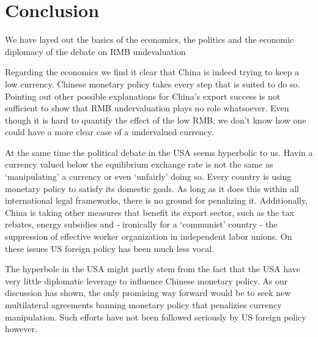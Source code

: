
\section{Conclusion}

We have layed out the basics of the economics, the politics and the economic diplomacy of the debate on RMB undevaluation

Regarding the economics we find it clear that China is indeed trying to keep a low currency. Chinese monetary policy takes every step that is suited to do so. Pointing out other possible explanations for China's export success is not sufficient to show that RMB undervaluation plays no role whatsoever. Even though it is hard to quantify the effect of the low RMB, we don't know how one could have a more clear case of a undervalued currency.

At the same time the political debate in the USA seems hyperbolic to us. Havin a currency valued below the equilibrium exchange rate is not the same as `manipulating' a currency or even `unfairly' doing so. Every country is using monetary policy to satisfy its domestic goals. As long as it does this within all international legal frameworks, there is no ground for penalizing it. Additionally, China is taking other measures that benefit its export sector, such as the tax rebates, energy subsidies and - ironically for a `communist' country - the suppression of effective worker organization in independent labor unions. On these issues US foreign policy has been much less vocal.

The hyperbole in the USA might partly stem from the fact that the USA have very little diplomatic leverage to influence Chinese monetary policy. As our discussion has shown, the only promising way forward would be to seek new multilateral agreements banning monetary policy that penalizies currency manipulation. Such efforts have not been followed seriously by US foreign policy however.

 